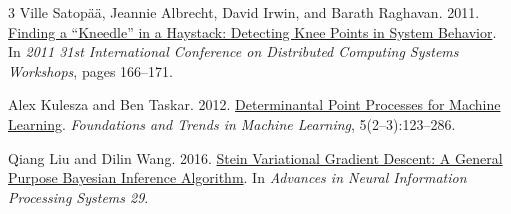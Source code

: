 \documentclass[11pt,twocolumn]{article}
\begin{document}
\begin{thebibliography}{3}
\small
{}
Ville Satop\"a\"a, Jeannie Albrecht, David Irwin, and Barath Raghavan. 2011.
\href{https://www.cs.williams.edu/~jeannie/papers/kneedle-simplex11.pdf}
{Finding a ``Kneedle'' in a Haystack: Detecting Knee Points in System Behavior}.
In \emph{2011 31st International Conference on Distributed Computing Systems Workshops}, pages 166--171.

Alex Kulesza and Ben Taskar. 2012.
\href{https://arxiv.org/abs/1207.6083}
{Determinantal Point Processes for Machine Learning}.
\emph{Foundations and Trends in Machine Learning}, 5(2--3):123--286.

Qiang Liu and Dilin Wang. 2016.
\href{https://arxiv.org/abs/1608.04471}
{Stein Variational Gradient Descent: A General Purpose Bayesian Inference Algorithm}.
In \emph{Advances in Neural Information Processing Systems 29}.
\end{thebibliography}
\end{document}
